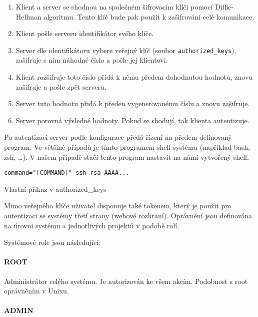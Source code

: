 \begin{enumerate}
    \item Klient a server se shodnou na společném šifrovacím klíči pomocí Diffie-Hellman algoritmu.
    Tento klíč bude pak použit k zašifrování celé komunikace.
    \item Klient pošle serveru identifikátor svého klíče.
    \item Server dle identifikátoru vybere veřejný klíč (soubor \verb|authorized_keys|), zašifruje s ním náhodné číslo a pošle jej klientovi.
    \item Klient rozšifruje toto číslo přidá k němu předem dohodnutou hodnotu, znovu zašifruje a pošle zpět serveru.
    \item Server tuto hodnotu přidá k předen vygenerovanému číslu a znovu zašifruje.
    \item Server porovná výsledné hodnoty. Pokud se shodují, tak klienta autentizuje.
\end{enumerate}

Po autentizaci server podle konfigurace předá řízení na předem definovaný program.
Ve většině případů je tímto programem shell systému (například bash, zsh, \ldots).
V našem případě stačí tento program nastavit na námi vytvořený shell.

\begin{listing}[ht]
\begin{verbatim}
command="[COMMAND]" ssh-rsa AAAA...
\end{verbatim}
\caption{Vlastní příkaz v authorized\_keys}
\end{listing}

Mimo veřejného klíče uživatel disponuje také tokenem, který je použit pro autentizaci se systémy třetí strany (webové rozhraní).
Oprávnění jsou definována na úrovni systému a jednotlivých projektů v podobě rolí.

\noindent\makebox[\linewidth]{\rule{\textwidth}{0.4pt}}

Systémové role jsou následující:

\paragraph{ROOT}

Administrátor celého systému.
Je autorizován ke všem akcím.
Podobnost s root oprávněním v Unixu.

\paragraph{ADMIN}


